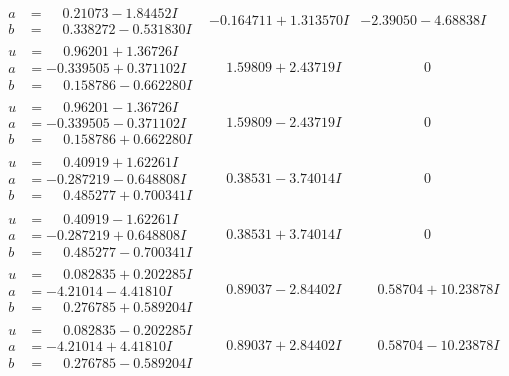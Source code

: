 \documentclass[1p]{elsarticle_modified}
\theoremstyle{definition}
\begin{document}
$$\begin{array}{c|c|c}
\begin{aligned}
a &= \phantom{-}0.21073 - 1.84452 I \\
b &= \phantom{-}0.338272 - 0.531830 I\end{aligned}
 & -0.164711 + 1.313570 I & -2.39050 - 4.68838 I \\ \hline\begin{aligned}
u &= \phantom{-}0.96201 + 1.36726 I \\
a &= -0.339505 + 0.371102 I \\
b &= \phantom{-}0.158786 - 0.662280 I\end{aligned}
 & \phantom{-}1.59809 + 2.43719 I & \phantom{-0.000000 } 0 \\ \hline\begin{aligned}
u &= \phantom{-}0.96201 - 1.36726 I \\
a &= -0.339505 - 0.371102 I \\
b &= \phantom{-}0.158786 + 0.662280 I\end{aligned}
 & \phantom{-}1.59809 - 2.43719 I & \phantom{-0.000000 } 0 \\ \hline\begin{aligned}
u &= \phantom{-}0.40919 + 1.62261 I \\
a &= -0.287219 - 0.648808 I \\
b &= \phantom{-}0.485277 + 0.700341 I\end{aligned}
 & \phantom{-}0.38531 - 3.74014 I & \phantom{-0.000000 } 0 \\ \hline\begin{aligned}
u &= \phantom{-}0.40919 - 1.62261 I \\
a &= -0.287219 + 0.648808 I \\
b &= \phantom{-}0.485277 - 0.700341 I\end{aligned}
 & \phantom{-}0.38531 + 3.74014 I & \phantom{-0.000000 } 0 \\ \hline\begin{aligned}
u &= \phantom{-}0.082835 + 0.202285 I \\
a &= -4.21014 - 4.41810 I \\
b &= \phantom{-}0.276785 + 0.589204 I\end{aligned}
 & \phantom{-}0.89037 - 2.84402 I & \phantom{-}0.58704 + 10.23878 I \\ \hline\begin{aligned}
u &= \phantom{-}0.082835 - 0.202285 I \\
a &= -4.21014 + 4.41810 I \\
b &= \phantom{-}0.276785 - 0.589204 I\end{aligned}
 & \phantom{-}0.89037 + 2.84402 I & \phantom{-}0.58704 - 10.23878 I \\ \hline\begin{aligned}

\end{aligned}
\end{array}$$
\end{document}
